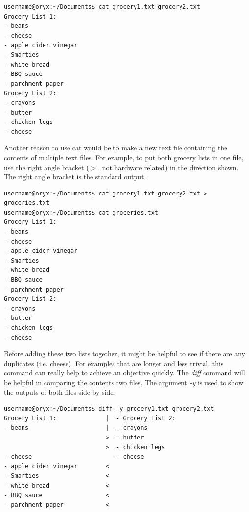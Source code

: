 \documentclass[12pt]{article}
\begin{document}
\begin{lstlisting}[numbers=none]
username@oryx:~/Documents$ cat grocery1.txt grocery2.txt
Grocery List 1:
- beans
- cheese
- apple cider vinegar
- Smarties
- white bread
- BBQ sauce
- parchment paper
Grocery List 2:
- crayons
- butter
- chicken legs
- cheese
\end{lstlisting}
\quad\enskip\quad Another reason to use cat would be to make a new text file containing the contents of multiple text files. For example, to put both grocery lists in one file, use the right angle bracket ($>$, not hardware related) in the direction shown. The right angle bracket is the standard output.
\begin{lstlisting}[numbers=none]
username@oryx:~/Documents$ cat grocery1.txt grocery2.txt > groceries.txt
username@oryx:~/Documents$ cat groceries.txt 
Grocery List 1:
- beans
- cheese
- apple cider vinegar
- Smarties
- white bread
- BBQ sauce
- parchment paper
Grocery List 2:
- crayons
- butter
- chicken legs
- cheese
\end{lstlisting}
\quad\enskip\quad Before adding these two lists together, it might be helpful to see if there are any duplicates (i.e. cheese). For examples that are longer and less trivial, this command can really help to achieve an objective quickly. The \textit{diff} command will be helpful in comparing the contents two files. The argument \textit{-y} is used to show the outputs of both files side-by-side.
\begin{lstlisting}[numbers=none]
username@oryx:~/Documents$ diff -y grocery1.txt grocery2.txt 
Grocery List 1:              |  - Grocery List 2:
- beans                      |  - crayons
                             >  - butter
                             >  - chicken legs
- cheese                        - cheese
- apple cider vinegar        <
- Smarties                   <
- white bread                <
- BBQ sauce                  <
- parchment paper            <
\end{lstlisting}
\end{document}
